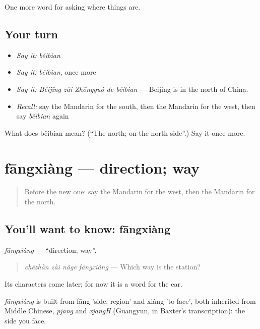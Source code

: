 \begin{grammarlens}[title={What you've built}]
One more word for asking where things are.
\end{grammarlens}

\subsection*{Your turn}
\begin{itemize}
\raggedright
  \item \emph{Say it:} \emph{běibian}
  \item \emph{Say it:} \emph{běibian}, once more
  \item \emph{Say it:} \emph{Běijīng zài Zhōngguó de běibian} — Beijing is in the north of China.
  \item \emph{Recall:} say the Mandarin for the south, then the Mandarin for the west, then say \emph{běibian} again
\end{itemize}

\begin{tcolorbox}[breakable,colback=teal!4,colframe=teal!35!black,title={Before you move on}]
What does běibian mean? (\textquotedblleft{}The north; on the north side\textquotedblright{}.) Say it once more.
\end{tcolorbox}
\section[fāngxiàng]{fāngxiàng — direction; way}

\label{lesson:ZH-C117-fangxiang}



\begin{quote}
Before the new one: say the Mandarin for the west, then the Mandarin for the north.
\end{quote}

\subsection*{You'll want to know: fāngxiàng}
\emph{fāngxiàng} — \textquotedblleft{}direction; way\textquotedblright{}.

\begin{quote}
\emph{chēzhàn zài nǎge fāngxiàng} — Which way is the station?
\end{quote}

Its characters come later; for now it is a word for the ear.

\begin{cousinweb}
\emph{fāngxiàng} is built from fāng 'side, region' and xiàng 'to face', both inherited from Middle Chinese, \emph{pjang} and \emph{xjangH} (Guangyun, in Baxter's transcription): the side you face.
\end{cousinweb}

